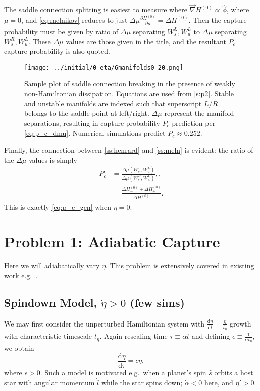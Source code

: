 \documentclass[
        fleqn,
        usenatbib,
    ]{mnras}
\newcommand*{\rd}[2]{\frac{\mathrm{d}#1}{\mathrm{d}#2}}
\newcommand*{\pd}[2]{\frac{\partial#1}{\partial#2}}
\newcommand*{\p}[1]{\left(#1\right)}
\begin{document}
The saddle connection splitting is easiest to measure where $\vec{\nabla}H^{(0)}
\propto \hat{\phi}$, where $\dot{\mu} = 0$, and \autoref{eq:melnikov} reduces to
just $\Delta \mu \pd{H^{(0)}}{\mu} = \Delta H^{(0)}$. Then the capture
probability must be given by ratio of $\Delta \mu$ separating $W_s^{L},
W_u^{L}$ to $\Delta \mu$ separating $W_s^{R}, W_u^{L}$. These $\Delta \mu$
values are those given in the title, and the resultant $P_c$ capture probability
is also quoted.
\begin{figure}[t]
    \centering
    \texttt{[image: ../initial/0\_eta/6manifolds0\_20.png]}
    \caption{Sample plot of saddle connection breaking in the presence of weakly
    non-Hamiltonian dissipation. Equations are used from \autoref{s:p2}. Stable
    and unstable manifolds are indexed such that superscript $L/R$ belongs to
    the saddle point at left/right. $\Delta \mu$ represent the manifold
    separations, resulting in capture probability $P_c$ prediction per
    \autoref{eq:p_c_dmu}. Numerical simulations predict $P_c \approx
    0.252$.}\label{fig:0_6manifolds}
\end{figure}

Finally, the connection between \autoref{ss:henrard} and \autoref{ss:meln} is
evident: the ratio of the $\Delta \mu$ values is simply
\begin{align}
    P_c &= \frac{\Delta \mu(W_s^{L}, W_u^{L})}{
            \Delta \mu\p{W_s^{R}, W_u^{L}}},\label{eq:p_c_dmu},\\
        &= \frac{\Delta H^{(0)}_- + \Delta H^{(0)}_+}{\Delta H^{(0)}_-}.
\end{align}
This is exactly \autoref{eq:p_c_gen} when $\dot{\eta} = 0$.

\section{Problem 1: Adiabatic Capture}\label{s:p1}

Here we will adiabatically vary $\eta$. This problem is extensively covered in
existing work e.g.\ \citep{henrard1987}.

\subsection{Spindown Model, $\dot{\eta} > 0$ (few sims)}\label{ss:p1_spindown}

We may first consider the unperturbed Hamiltonian
system with $\rd{\eta}{t} = \frac{\eta}{t_\eta}$ growth with characteristic
timescale $t_\eta$. Again rescaling time $\tau \equiv \alpha t$ and defining
$\epsilon \equiv \frac{1}{\alpha t_\eta}$, we obtain
\begin{equation}
    \rd{\eta}{\tau} = \epsilon \eta,\label{eq:p1_eom}
\end{equation}
where $\epsilon > 0$. Such a model is motivated e.g.\ when a planet's
spin $\hat{s}$ orbits a host star with angular momentum $\hat{l}$ while the star
spins down; $\dot{\alpha} < 0$ here, and $\eta' > 0$.
\end{document}
